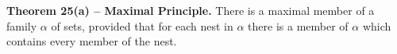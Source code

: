 \textbf{Theorem 25(a) -- Maximal Principle.} There is a maximal member of a family $\alpha$ of sets, provided that for each nest in $\alpha$ there is a member of $\alpha$ which contains every member of the nest.
